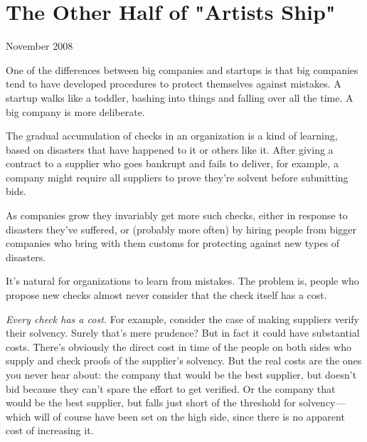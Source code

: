 \chapter{The Other Half of "Artists Ship"}


            
              
                

November 2008

One of the differences between big
                  companies and startups is that big companies tend to have
                  developed procedures to protect themselves against mistakes. A
                  startup walks like a toddler, bashing into things and falling
                  over all the time. A big company is more deliberate.

The
                  gradual accumulation of checks in an organization is a kind of
                  learning, based on disasters that have happened to it or
                  others like it. After giving a contract to a supplier who goes
                  bankrupt and fails to deliver, for example, a company might
                  require all suppliers to prove they're solvent before
                  submitting bids.

As companies grow they invariably
                  get more such checks, either in response to disasters they've
                  suffered, or (probably more often) by hiring people from
                  bigger companies who bring with them customs for protecting
                  against new types of disasters.

It's natural for
                  organizations to learn from mistakes. The problem is, people
                  who propose new checks almost never consider that the check
                  itself has a cost.

\emph{Every check has a cost.}
                  For example, consider the case of making suppliers verify
                  their solvency. Surely that's mere prudence? But in fact it
                  could have substantial costs. There's obviously the direct
                  cost in time of the people on both sides who supply and check
                  proofs of the supplier's solvency. But the real costs are the
                  ones you never hear about: the company that would be the best
                  supplier, but doesn't bid because they can't spare the effort
                  to get verified. Or the company that would be the best
                  supplier, but falls just short of the threshold for
                  solvency---which will of course have been set on the high
                  side, since there is no apparent cost of increasing it.


